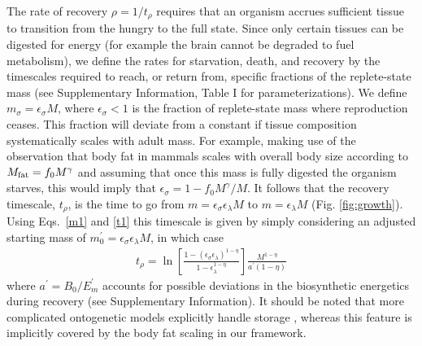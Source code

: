\documentclass[twocolumn,preprintnumbers,amsmath,amssymb,superscriptaddress]{revtex4}
\begin{document}
\begin{bibunit}[unsrt]
{The rate of recovery $\rho = 1/t_\rho$ requires that an organism accrues
sufficient tissue to transition from the hungry to the full state.  Since
only certain tissues can be digested for energy (for example the brain cannot
be degraded to fuel metabolism), we define the rates for starvation, death,
and recovery by the timescales required to reach, or return from, specific
fractions of the replete-state mass (see Supplementary Information, Table I for parameterizations).  We define
$m_{\sigma}=\epsilon_{\sigma} M$, where $\epsilon_{\sigma}<1$ is the fraction of
replete-state mass where reproduction ceases. This fraction will deviate from a constant
if tissue composition systematically scales with adult mass.  For example,
making use of the observation that body fat in mammals scales with overall
body size according to $M_{\rm fat}=f_{0}M^{\gamma}$ and assuming that once
this mass is fully digested the organism starves, this would imply that
$\epsilon_{\sigma}=1-f_{0}M^{\gamma}/M$. It follows that the
recovery timescale, $t_{\rho}$, is the time to go from
$m=\epsilon_{\sigma} \epsilon_{\lambda} M$ to $m=\epsilon_{\lambda}M$ (Fig. \ref{fig:growth}). Using Eqs.~\eqref{m1} and \eqref{t1} this timescale is given by simply considering an adjusted starting mass of $m_{0}^{\prime}=\epsilon_{\sigma}\epsilon_{\lambda}M$, in which case
\begin{eqnarray}
\label{rhotimescale}
t_{\rho}=\ln\left[\frac{1-\left(\epsilon_{\sigma}\epsilon_{\lambda}\right)^{1-\eta}}{1-\epsilon_\lambda^{1-\eta}}\right]\frac{M^{1-\eta}}{a^{\prime}\left(1-\eta\right)}
\end{eqnarray}
where $a^{\prime}=B_{0}/E_{m}^{\prime}$ accounts for possible deviations in the biosynthetic energetics during recovery (see Supplementary Information). It should be noted that more complicated ontogenetic models explicitly handle
storage \citep{hou}, whereas this feature is implicitly covered by the body
fat scaling in our framework.



}
\end{bibunit}
\end{document}
